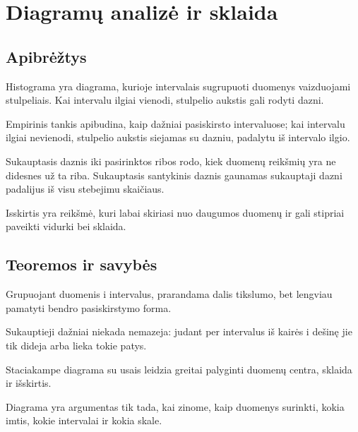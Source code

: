 \section{Diagramų analizė ir sklaida}\label{sec:diagramu-analize-ir-sklaida}

\subsection{Apibrėžtys}
\begin{apibreztis}
Histograma yra diagrama, kurioje intervalais sugrupuoti duomenys vaizduojami stulpeliais. Kai intervalu ilgiai vienodi, stulpelio aukstis gali rodyti dazni.
\end{apibreztis}
\begin{apibreztis}
Empirinis tankis apibudina, kaip dažniai pasiskirsto intervaluose; kai intervalu ilgiai nevienodi, stulpelio aukstis siejamas su dazniu, padalytu iš intervalo ilgio.
\end{apibreztis}
\begin{apibreztis}
Sukauptasis daznis iki pasirinktos ribos rodo, kiek duomenų reikšmių yra ne didesnes už ta riba. Sukauptasis santykinis daznis gaunamas sukauptaji dazni padalijus iš visu stebejimu skaičiaus.
\end{apibreztis}
\begin{apibreztis}
Isskirtis yra reikšmė, kuri labai skiriasi nuo daugumos duomenų ir gali stipriai paveikti vidurki bei sklaida.
\end{apibreztis}

\subsection{Teoremos ir savybės}
\begin{savybe}
Grupuojant duomenis i intervalus, prarandama dalis tikslumo, bet lengviau pamatyti bendro pasiskirstymo forma.
\end{savybe}
\begin{savybe}
Sukauptieji dažniai niekada nemazeja: judant per intervalus iš kairės i dešinę jie tik dideja arba lieka tokie patys.
\end{savybe}
\begin{savybe}
Staciakampe diagrama su usais leidzia greitai palyginti duomenų centra, sklaida ir išskirtis.
\end{savybe}
\begin{pastaba}
Diagrama yra argumentas tik tada, kai zinome, kaip duomenys surinkti, kokia imtis, kokie intervalai ir kokia skale.
\end{pastaba}

